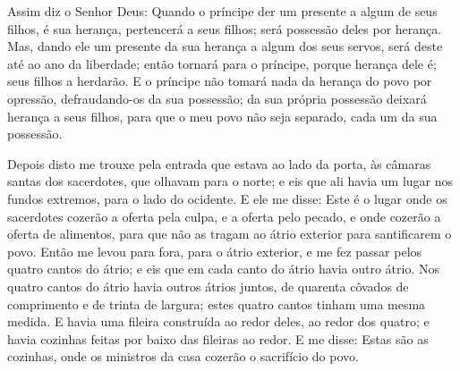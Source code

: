 Assim diz o Senhor Deus: Quando o príncipe der um presente a
algum de seus filhos, é sua herança, pertencerá a seus filhos; será
possessão deles por herança. Mas, dando ele um presente da
sua herança a algum dos seus servos, será deste até ao ano da
liberdade; então tornará para o príncipe, porque herança dele é;
seus filhos a herdarão. E o príncipe não tomará nada da
herança do povo por opressão, defraudando-os da sua possessão; da
sua própria possessão deixará herança a seus filhos, para que o meu
povo não seja separado, cada um da sua possessão.

Depois disto me trouxe pela entrada que estava ao lado da porta,
às câmaras santas dos sacerdotes, que olhavam para o norte; e eis
que ali havia um lugar nos fundos extremos, para o lado do ocidente.
E ele me disse: Este é o lugar onde os sacerdotes cozerão a
oferta pela culpa, e a oferta pelo pecado, e onde cozerão a oferta
de alimentos, para que não as tragam ao átrio exterior para
santificarem o povo. Então me levou para fora, para o átrio
exterior, e me fez passar pelos quatro cantos do átrio; e eis que em
cada canto do átrio havia outro átrio. Nos quatro cantos do
átrio havia outros átrios juntos, de quarenta côvados de comprimento
e de trinta de largura; estes quatro cantos tinham uma mesma medida.
E havia uma fileira construída ao redor deles, ao redor dos
quatro; e havia cozinhas feitas por baixo das fileiras ao redor.
E me disse: Estas são as cozinhas, onde os ministros da casa
cozerão o sacrifício do povo.

\medskip


